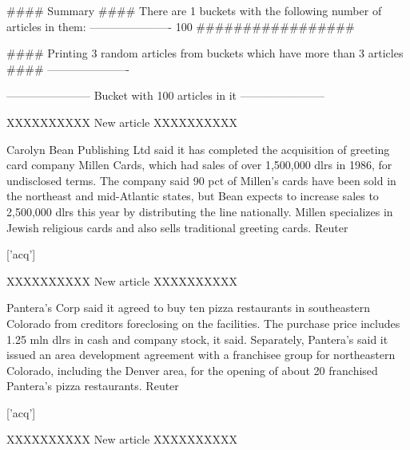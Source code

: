 \documentclass{article}
\begin{document}
\begin{pythonOutput}
#### Summary ####
There are 1 buckets with the following number of articles in them:
----------------------
100
#################

#### Printing 3 random articles from buckets which have more than 3 articles ####
----------------------

-----------------------
Bucket with 100 articles in it
-----------------------


XXXXXXXXXX
New article
XXXXXXXXXX

Carolyn Bean Publishing Ltd said
it has completed the acquisition of greeting card company
Millen Cards, which had sales of over 1,500,000 dlrs in 1986,
for undisclosed terms.
    The company said 90 pct of Millen's cards have been sold in
the northeast and mid-Atlantic states, but Bean expects to
increase sales to 2,500,000 dlrs this year by distributing the
line nationally.
    Millen specializes in Jewish religious cards and also sells
traditional greeting cards.
 Reuter

['acq']

XXXXXXXXXX
New article
XXXXXXXXXX

Pantera's Corp said it agreed to
buy ten pizza restaurants in southeastern Colorado from
creditors foreclosing on the facilities.
    The purchase price includes 1.25 mln dlrs in cash and
company stock, it said.
    Separately, Pantera's said it issued an area development
agreement with a franchisee group for northeastern Colorado,
including the Denver area, for the opening of about 20
franchised Pantera's pizza restaurants.
 Reuter

['acq']

XXXXXXXXXX
New article
XXXXXXXXXX


\end{pythonOutput}
\end{document}
